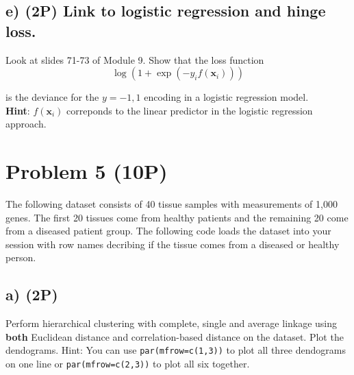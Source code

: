 \documentclass[]{article}
\newenvironment{Shaded}{\begin{snugshade}}{\end{snugshade}}
\newcommand{\CommentTok}[1]{\textcolor[rgb]{0.56,0.35,0.01}{\textit{#1}}}
\begin{document}
\hypertarget{e-2p-link-to-logistic-regression-and-hinge-loss.}{%
\subsection{e) (2P) Link to logistic regression and hinge
loss.}\label{e-2p-link-to-logistic-regression-and-hinge-loss.}}

Look at slides 71-73 of Module 9. Show that the loss function
\[ \log(1+\exp(-y_i f({\boldsymbol x}_i)))\]

is the deviance for the \(y=-1,1\) encoding in a logistic regression
model.\\
\textbf{Hint}: \(f({\boldsymbol x}_i)\) correponds to the linear
predictor in the logistic regression approach.

\hypertarget{problem-5-10p}{%
\section{Problem 5 (10P)}\label{problem-5-10p}}

The following dataset consists of 40 tissue samples with measurements of
1,000 genes. The first 20 tissues come from healthy patients and the
remaining 20 come from a diseased patient group. The following code
loads the dataset into your session with row names decribing if the
tissue comes from a diseased or healthy person.

\begin{Shaded}
\end{Shaded}

\hypertarget{a-2p}{%
\subsection{a) (2P)}\label{a-2p}}

Perform hierarchical clustering with complete, single and average
linkage using \textbf{both} Euclidean distance and correlation-based
distance on the dataset. Plot the dendograms. Hint: You can use
\texttt{par(mfrow=c(1,3))} to plot all three dendograms on one line or
\texttt{par(mfrow=c(2,3))} to plot all six together.
\end{document}
